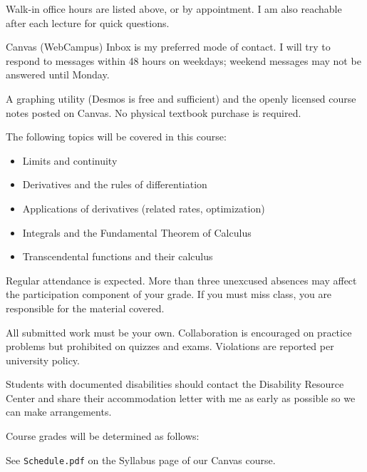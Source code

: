 \documentclass{syllabus}
\begin{document}
\maketitle

Walk-in office hours are listed above, or by appointment. I am also reachable
after each lecture for quick questions.

Canvas (WebCampus) Inbox is my preferred mode of contact. I will try to respond
to messages within 48 hours on weekdays; weekend messages may not be answered
until Monday.

A graphing utility (Desmos is free and sufficient) and the openly licensed
course notes posted on Canvas. No physical textbook purchase is required.

The following topics will be covered in this course:
\begin{itemize}
	\item Limits and continuity
	\item Derivatives and the rules of differentiation
	\item Applications of derivatives (related rates, optimization)
	\item Integrals and the Fundamental Theorem of Calculus
	\item Transcendental functions and their calculus
\end{itemize}

Regular attendance is expected. More than three unexcused absences may affect
the participation component of your grade. If you must miss class, you are
responsible for the material covered.

All submitted work must be your own. Collaboration is encouraged on practice
problems but prohibited on quizzes and exams. Violations are reported per
university policy.

Students with documented disabilities should contact the Disability Resource
Center and share their accommodation letter with me as early as possible so we
can make arrangements.

Course grades will be determined as follows:


See \texttt{Schedule.pdf} on the Syllabus page of our Canvas course.
\end{document}
